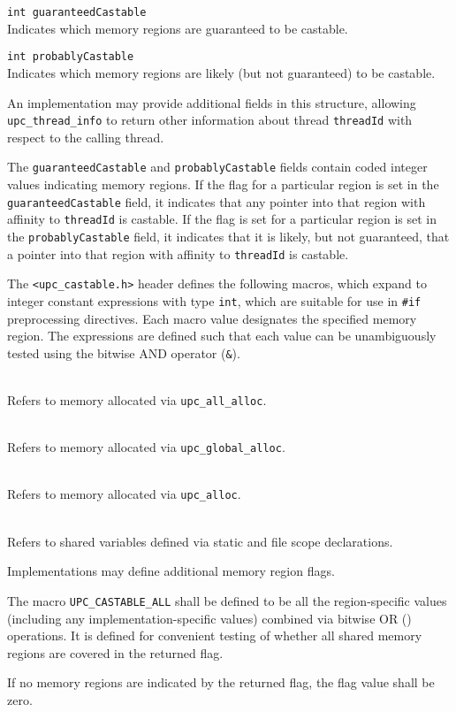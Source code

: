 \begin{description}
\item{\tt int guaranteedCastable} \hfill \\
Indicates which memory regions are guaranteed to be castable.
\item{\tt int probablyCastable} \hfill \\
Indicates which memory regions are likely (but not guaranteed)
to be castable.
\end{description}

\np An implementation may provide additional fields in this structure,
allowing {\tt upc\_thread\_info} to return other information about
thread {\tt threadId} with respect to the calling thread.

\np The {\tt guaranteedCastable} and {\tt probablyCastable} fields
contain coded integer values indicating memory regions.  If the flag
for a particular region is set in the {\tt guaranteedCastable} field,
it indicates that
any pointer into that region with affinity to {\tt threadId} is
castable.  If the flag is
set for a particular region is set in the {\tt probablyCastable} field,
it indicates that it is likely, but not guaranteed, that a pointer into
that region with affinity to {\tt threadId} is castable.

\np The {\tt <upc\_castable.h>} header defines the following macros, which expand to
integer constant expressions with type {\tt int}, which are suitable for use
in {\tt \#if} preprocessing directives. Each macro value designates the specified
memory region. The expressions are defined such that each value can be unambiguously
tested using the bitwise AND operator ({\tt \&}).

\begin{description}
\item[{\tt UPC\_CASTABLE\_ALL\_ALLOC}] \hfill \\
Refers to memory allocated via {\tt upc\_all\_alloc}.
\item[{\tt UPC\_CASTABLE\_GLOBAL\_ALLOC}] \hfill \\
Refers to memory allocated via {\tt upc\_global\_alloc}.
\item[{\tt UPC\_CASTABLE\_ALLOC}] \hfill \\
Refers to memory allocated via {\tt upc\_alloc}.
\item[{\tt UPC\_CASTABLE\_STATIC}] \hfill \\
Refers to shared variables defined via static and file scope declarations.
\end{description}

\np Implementations may define additional memory region flags.

\np The macro {\tt UPC\_CASTABLE\_ALL} shall
be defined to be all the region-specific values (including any
implementation-specific values) combined via bitwise
OR ({\textbar}) operations.  It is defined for convenient testing of
whether all shared memory regions are covered in the returned flag.

\np If no memory regions are indicated by the returned flag, the flag
value shall be zero.


